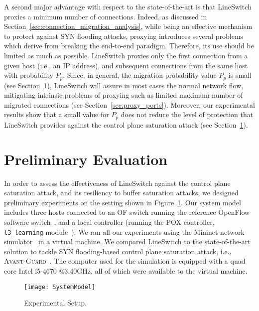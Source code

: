 \documentclass{sig-alternate}
\newcommand{\avantguard}{\textsc{Avant-Guard}}
\begin{document}
A second major advantage with respect to the state-of-the-art is that LineSwitch proxies a minimum number of connections.
Indeed, as discussed in Section~\ref{sec:connection_migration_analysis}, while being an effective mechanism to protect against SYN flooding attacks, 
proxying introduces several problems which derive from breaking the end-to-end paradigm.
Therefore, its use should be limited as much as possible. LineSwitch proxies only the first connection from a given host (i.e., an IP address), and subsequent connections from the same host with probability $P_p$. 
Since, in general, the migration probability value $P_p$ is small (see Section~\ref{sec:evaluation}), LineSwitch will assure in most cases the normal network flow, mitigating intrinsic problems of proxying such as limited maximum number of migrated connections (see Section~\ref{sec:proxy_ports}).
 Moreover, our experimental results show that a small value for $P_p$ does not reduce the level of protection that LineSwitch provides against the control plane saturation attack (see Section~\ref{sec:evaluation}).







\section{Preliminary Evaluation}\label{sec:evaluation}

In order to assess the effectiveness of LineSwitch against the control plane saturation attack, and its resiliency to buffer saturation attacks, we designed preliminary experiments on the setting shown in Figure~\ref{fig:sim_setup}. Our system model includes three hosts connected to an OF switch running the reference OpenFlow software switch~\cite{RefOFSwitch}, and a local controller (running the POX controller, {\tt l3\_learning} module~\cite{POX}).
We ran all our experiments using the Mininet network simulator~\cite{Mininet} in a virtual machine.
We compared LineSwitch to the state-of-the-art solution to tackle SYN flooding-based control plane saturation attack, i.e., \avantguard~\cite{AvantGuard}.
The computer used for the simulation is equipped with a quad core Intel i5-4670 @3.40GHz, all of which were available to the virtual machine.
	
	\begin{figure}[h!t]
	    \centering
	    \texttt{[image: SystemModel]}
		\caption{Experimental Setup.}
	    \label{fig:sim_setup}
	\end{figure}
\end{document}
